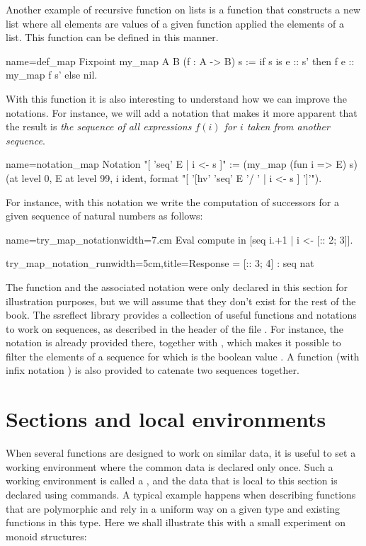 Another example of recursive function on lists is a function that constructs
a new list where all elements are values of a given function applied
the elements of a list.  This function can be defined in this
manner.

\begin{coq}{name=def_map}{}
Fixpoint my_map A B (f : A -> B) s :=
  if s is e :: s' then f e :: my_map f s' else nil.
\end{coq}
With this function it is also interesting to understand how we can
improve the notations.  For instance, we will add a notation that
makes it more apparent that the result is {\em the sequence of all
expressions \(f(i)\) for \(i\) taken from another sequence}.

\begin{coq}{name=notation_map}{}
Notation "[ 'seq' E | i <- s ]" := (my_map (fun i => E) s)
  (at level 0, E at level 99, i ident,
   format "[ '[hv' 'seq' E '/ ' | i <- s  ] ']'").
\end{coq}
For instance, with this notation we write the computation of successors
for a given sequence of natural numbers as follows:

\begin{coq}{name=try_map_notation}{width=7.cm}
Eval compute in [seq i.+1 | i <- [:: 2; 3]].
\end{coq}
\begin{coqout}{try_map_notation_run}{width=5cm,title=Response}
= [:: 3; 4] : seq nat
\end{coqout}
The function  and the associated notation were only declared
in this section for illustration purposes, but we will assume that
they don't exist for the rest of the book.  The ssreflect library
provides a collection of useful functions and notations to work on
sequences, as described in the header of the file .  For
instance, the notation \C{[seq F | i <- s]} is already provided there,
together with \C{[seq i | i < s | p]}, which makes it possible to
filter the elements of a sequence for which  is the boolean
value .  A function  (with infix notation \C{++}) is
also provided to catenate two sequences together.

\section{Sections and local environments}
When several functions are designed to work on similar data, it is
useful to set a working environment where the common data is declared
only once.  Such a working environment is called a , and
the data that is local to this section is declared using 
commands.  A typical example happens when describing functions that
are polymorphic and rely in a uniform way on a given type and existing
functions in this type.  Here we shall illustrate this with a small
experiment on monoid structures:


